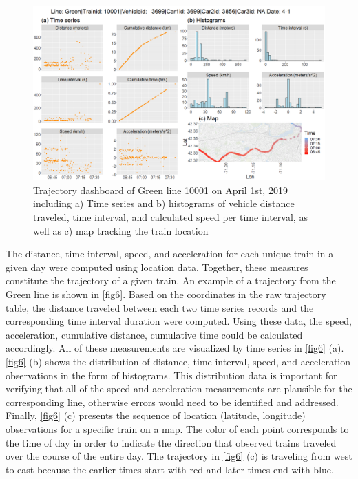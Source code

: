 \documentclass[times]{TRR}
\begin{document}
\begin{figure}[ht!]
    \centering
    \includegraphics[scale=0.3]{Figure_6_case_green_example.png}
    \caption{Trajectory dashboard of Green line 10001 on April 1st, 2019 including a) Time series and b) histograms of vehicle distance traveled, time interval, and calculated speed per time interval, as well as c) map tracking the train location}
    \label{fig6}
\end{figure}

The distance, time interval, speed, and acceleration for each unique train in a given day were computed using location data. Together, these measures constitute the trajectory of a given train. An example of a trajectory from the Green line is shown in \autoref{fig6}.  Based on the coordinates in the raw trajectory table, the distance traveled between each two time series records and the corresponding time interval duration were computed. Using these data, the speed, acceleration, cumulative distance, cumulative time could be calculated accordingly. All of these measurements are visualized by time series in \autoref{fig6} (a). \autoref{fig6} (b) shows the distribution of distance, time interval, speed, and acceleration observations in the form of histograms. This distribution data is important for verifying that all of the speed and acceleration measurements are plausible for the corresponding line, otherwise errors would need to be identified and addressed. Finally, \autoref{fig6} (c) presents the sequence of location (latitude, longitude) observations for a specific train on a map.  The color of each point corresponds to the time of day in order to indicate the direction that observed trains traveled over the course of the entire day.  The trajectory in \autoref{fig6} (c) is traveling from west to east because the earlier times start with red and later times end with blue.
\end{document}

